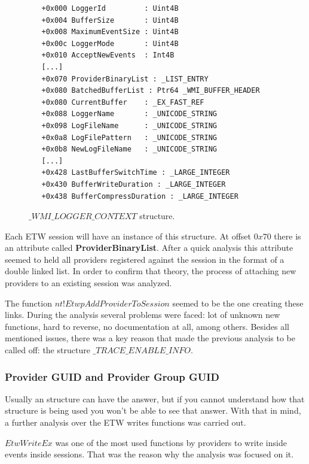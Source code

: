 \begin{figure}[H]
  \begin{lstlisting}
   +0x000 LoggerId         : Uint4B
   +0x004 BufferSize       : Uint4B
   +0x008 MaximumEventSize : Uint4B
   +0x00c LoggerMode       : Uint4B
   +0x010 AcceptNewEvents  : Int4B
   [...]
   +0x070 ProviderBinaryList : _LIST_ENTRY
   +0x080 BatchedBufferList : Ptr64 _WMI_BUFFER_HEADER
   +0x080 CurrentBuffer    : _EX_FAST_REF
   +0x088 LoggerName       : _UNICODE_STRING
   +0x098 LogFileName      : _UNICODE_STRING
   +0x0a8 LogFilePattern   : _UNICODE_STRING
   +0x0b8 NewLogFileName   : _UNICODE_STRING
   [...]
   +0x428 LastBufferSwitchTime : _LARGE_INTEGER
   +0x430 BufferWriteDuration : _LARGE_INTEGER
   +0x438 BufferCompressDuration : _LARGE_INTEGER
  \end{lstlisting} 
  \caption[]{$\_WMI\_LOGGER\_CONTEXT$ structure.}
  \label{fig:wmi_logger_context}
\end{figure}

Each ETW session will have an instance of this structure. At offset $0x70$ there is an attribute called {\bfseries ProviderBinaryList}. After a quick analysis this attribute seemed to held all providers registered against the session in the format of a double linked list. In order to confirm that theory, the process of attaching new providers to an existing session was analyzed. 

The function $nt!EtwpAddProviderToSession$ seemed to be the one creating these links. During the analysis several problems were faced: lot of unknown new functions, hard to reverse, no documentation at all, among others. Besides all mentioned issues, there was a key reason that made the previous analysis to be called off: the structure $\_TRACE\_ENABLE\_INFO$.




\subsubsection{\bfseries Provider GUID and Provider Group GUID}

Usually an structure can have the answer, but if you cannot understand how that structure is being used you won't be able to see that answer. With that in mind, a further analysis over the ETW writes functions was carried out.

$EtwWriteEx$ was one of the most used functions by providers to write inside events inside sessions. That was the reason why the analysis was focused on it.


